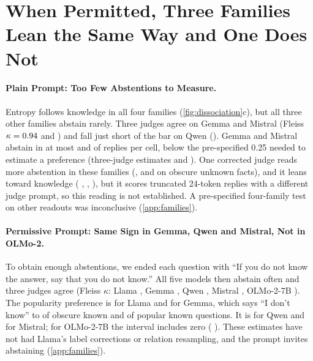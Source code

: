 \documentclass[manuscript,screen,review,anonymous,nonacm]{acmart}
\newcommand{\idk}{``I don't know''}
\begin{document}
\section{When Permitted, Three Families Lean the Same Way and One Does Not}
\label{sec:families}

\paragraph{Plain Prompt: Too Few Abstentions to Measure.} Entropy follows knowledge in all four families (\cref{fig:dissociation}c), but all three other families abstain rarely. Three judges agree on Gemma and Mistral (Fleiss $\kappa=0.94$ and \tjMistralKappa) and fall just short of the bar on Qwen (\tjQwenKappa). Gemma and Mistral abstain in at most \tjGemmaObsUnk{} and \tjMistralObsUnk{} of replies per cell, below the pre-specified 0.25 needed to estimate a preference (three-judge estimates \tjGemmaDiff{} \tjGemmaDiffCI{} and \tjMistralDiff{} \tjMistralDiffCI). One corrected judge reads more abstention in these families (\mcQwenObsUnk, \mcGemmaObsUnk{} and \mcMistralObsUnk{} on obscure unknown facts), and it leans toward knowledge (\mcQwenDiff{} \mcQwenDiffCI, \mcGemmaDiff{} \mcGemmaDiffCI, \mcMistralDiff{} \mcMistralDiffCI), but it scores truncated 24-token replies with a different judge prompt, so this reading is not established. A pre-specified four-family test on other readouts was inconclusive (\cref{app:families}).

\paragraph{Permissive Prompt: Same Sign in Gemma, Qwen and Mistral, Not in OLMo-2.} To obtain enough abstentions, we ended each question with ``If you do not know the answer, say that you do not know.'' All five models then abstain often and three judges agree (Fleiss $\kappa$: Llama \pmLlamaKappa, Gemma \pmGemmaKappa, Qwen \pmQwenKappa, Mistral \pmMistralKappa, OLMo-2-7B \pmOlmoKappa). The popularity preference is \pmLlamaDiff{} \pmLlamaDiffCI{} for Llama and \pmGemmaDiff{} \pmGemmaDiffCI{} for Gemma, which says \idk{} to \pmGemmaObsKnown{} of obscure known and \pmGemmaPopKnown{} of popular known questions. It is \pmQwenDiff{} \pmQwenDiffCI{} for Qwen and \pmMistralDiff{} \pmMistralDiffCI{} for Mistral; for OLMo-2-7B the interval includes zero (\pmOlmoDiff{} \pmOlmoDiffCI). These estimates have not had Llama's label corrections or relation resampling, and the prompt invites abstaining (\cref{app:families}).
\end{document}
